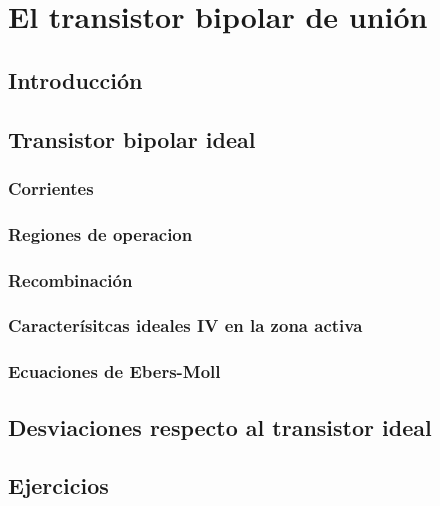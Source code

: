 
\chapter{El transistor bipolar de unión}


\section{Introducción}


\section{Transistor bipolar ideal}

\subsection{Corrientes}

\subsection{Regiones de operacion}

\subsection{Recombinación}

\subsection{Caracterísitcas ideales IV en la zona activa}

\subsection{Ecuaciones de Ebers-Moll}


\section{Desviaciones respecto al transistor ideal}


\newpage 


\section{Ejercicios}




